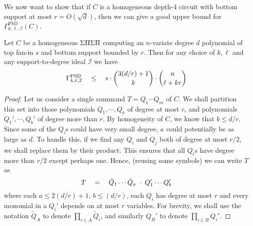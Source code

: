 We now want to show that if $C$ is a homogeneous depth-$4$ circuit with bottom support at most $r = O(\sqrt{d})$, then we can give a good upper bound for $\Gamma^{\mathrm{PSD}}_{k,\ell,\mathcal{I}}(C)$. 

\begin{lemma}\label{lem:PSPD-I-upperbound} Let $C$ be a homogeneous $\Sigma\Pi\Sigma\Pi$ computing an $n$-variate degree $d$ polynomial of top fan-in $s$ and bottom support bounded by $r$. Then for any choice of $k,\ell$ and any support-to-degree ideal $\mathcal{I}$ we have
\[
\Gamma^{\mathrm{PSD}}_{k,\ell,\mathcal{I}} \quad \leq \quad s \cdot \binom{3(d/r) + 1}{k} \cdot \binom{n}{\ell + kr}
\]
\end{lemma}
\begin{proof}
  Let us consider a single summand $T = Q_1 \cdots Q_m$ of $C$.
We shall partition this set into those polynomials $Q_1,\cdots, Q_a$ of degree at most $r$, and polynomials $Q_1',\cdots, Q_b'$ of degree more than $r$. By homogeneity of $C$, we know that $b \leq d/r$. Since some of the $Q_i$s could have very small degree, $a$ could potentially be as large as $d$. To handle this, if we find any $Q_i$ and $Q_j$ both of degree at most $r/2$, we shall replace them by their product. This ensures that all $Q_i$s have degree more than $r/2$ except perhaps one. Hence, (reusing some symbols) we can write $T$ as
\[
T \quad = \quad \tilde{Q}_1 \cdots \tilde{Q}_a \;\cdot\; Q_1' \cdots Q_b'
\]
where each $a \leq 2(d/r) + 1$, $b \leq (d/r)$, each $Q_i$ has degree at most $r$ and every monomial in a $Q_i'$ depends on at most $r$ variables. For brevity, we shall use the notation $\tilde{Q}_A$ to denote $\prod_{i\in A} \tilde{Q}_i$, and similarly $Q_B'$ to denote $\prod_{i\in B} Q_i'$. 


\end{proof}
